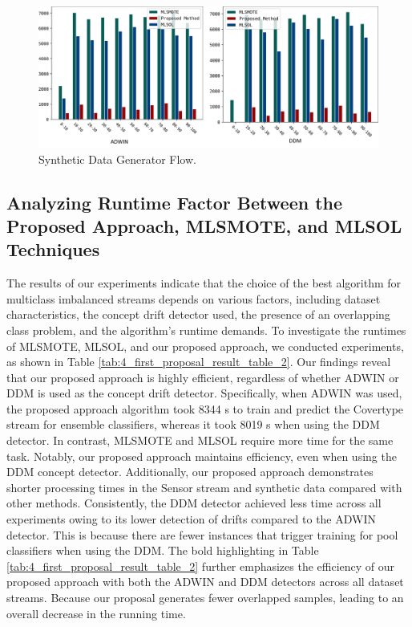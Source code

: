 \begin{figure}[!ht]
	\centering
	\includegraphics[width=1\linewidth]{4_Imbalanced/figures/exp_9.png}
	\caption{Synthetic Data Generator Flow.}
	\label{fig:4_first_proposal_result_exp_9}
\end{figure}

\subsection{Analyzing Runtime Factor Between the Proposed Approach, MLSMOTE, and MLSOL Techniques}
The results of our experiments indicate that the choice of the best algorithm for multiclass imbalanced streams depends on various factors, including dataset characteristics, the concept drift detector used, the presence of an overlapping class problem, and the algorithm's runtime demands. To investigate the runtimes of MLSMOTE, MLSOL, and our proposed approach, we conducted experiments, as shown in Table \ref{tab:4_first_proposal_result_table_2}. Our findings reveal that our proposed approach is highly efficient, regardless of whether ADWIN or DDM is used as the concept drift detector. Specifically, when ADWIN was used, the proposed approach algorithm took 8344 s to train and predict the Covertype stream for ensemble classifiers, whereas it took 8019 s when using the DDM detector. In contrast, MLSMOTE and MLSOL require more time for the same task. Notably, our proposed approach maintains efficiency, even when using the DDM concept detector. Additionally, our proposed approach demonstrates shorter processing times in the Sensor stream and synthetic data compared with other methods. Consistently, the DDM detector achieved less time across all experiments owing to its lower detection of drifts compared to the ADWIN detector. This is because there are fewer instances that trigger training for pool classifiers when using the DDM. The bold highlighting in Table \ref{tab:4_first_proposal_result_table_2} further emphasizes the efficiency of our proposed approach with both the ADWIN and DDM detectors across all dataset streams. Because our proposal generates fewer overlapped samples, leading to an overall decrease in the running time.

